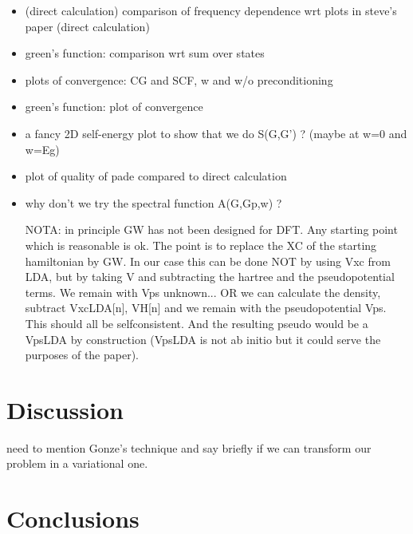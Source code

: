 \documentclass[twocolumn,prb,showpacs,superscriptaddress]{revtex4}
\def\w{\omega}
\def\r{{\bf r}}
\def\rp{{\bf r^\prime}}
\begin{document}
\begin{itemize}

\item
(direct calculation)
comparison of frequency dependence wrt plots in steve's paper
(direct calculation)

\item
green's function: comparison wrt sum over states

\item
plots of convergence: CG and SCF, w and w/o preconditioning

\item
green's function: plot of convergence

\item
a fancy 2D self-energy plot to show that we do S(G,G') ?
(maybe at w=0 and w=Eg)

\item
plot of quality of pade compared to direct calculation

\item
why don't we try the spectral function A(G,Gp,w) ?

NOTA: in principle GW has not been designed for DFT. Any starting
point which is reasonable is ok. The point is to replace the XC
of the starting hamiltonian by GW. In our case this can be done
NOT by using Vxc from LDA, but by taking V and subtracting the
hartree and the pseudopotential terms. We remain with Vps unknown...
OR we can calculate the density, subtract VxcLDA[n], VH[n] and
we remain with the pseudopotential Vps. This should all be selfconsistent.
And the resulting pseudo would be a VpsLDA by construction
(VpsLDA is not ab initio but it could serve the purposes of the paper).

\end{itemize}

\section{Discussion}\label{sec.discussion}

need to mention Gonze's technique and say briefly if we can transform our problem
in a variational one.

\section{Conclusions}\label{sec.conclusions}


\end{document}
